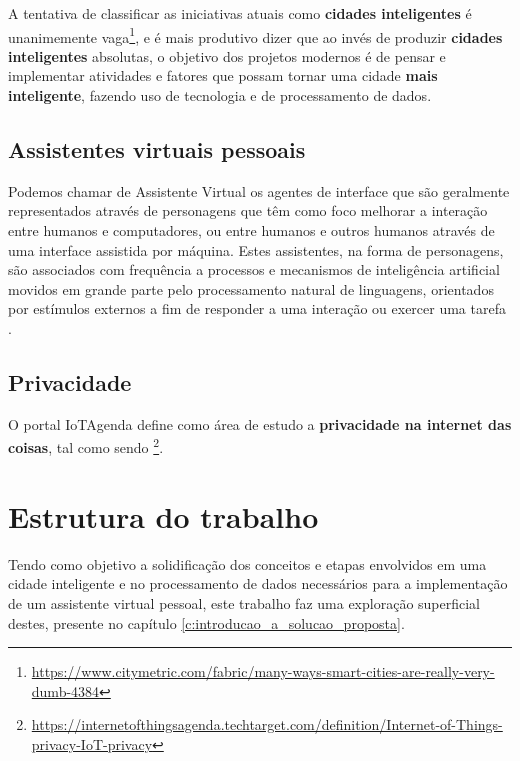 A tentativa de classificar as iniciativas atuais como \textbf{cidades inteligentes} é unanimemente vaga\footnote{\url{https://www.citymetric.com/fabric/many-ways-smart-cities-are-really-very-dumb-4384}}, e é mais produtivo dizer que ao invés de produzir \textbf{cidades inteligentes} absolutas, o objetivo dos projetos modernos é de pensar e implementar atividades e fatores que possam tornar uma cidade \textbf{mais inteligente}, fazendo uso de tecnologia e de processamento de dados.

\subsection{Assistentes virtuais pessoais} \label{ss:assistentes_virtuais_pessoais}

Podemos chamar de Assistente Virtual os agentes de interface que são geralmente representados através de personagens que têm como foco melhorar a interação entre humanos e computadores, ou entre humanos e outros humanos através de uma interface assistida por máquina. Estes assistentes, na forma de personagens, são associados com frequência a processos e mecanismos de inteligência artificial movidos em grande parte pelo processamento natural de linguagens, orientados por estímulos externos a fim de responder a uma interação ou exercer uma tarefa \cite{reategui2006agentes}.

\subsection{Privacidade} \label{ss:privacidade_na_internet_das_coisas}

O portal IoTAgenda define como área de estudo a \textbf{privacidade na internet das coisas}, tal como sendo  \footnote{\url{https://internetofthingsagenda.techtarget.com/definition/Internet-of-Things-privacy-IoT-privacy}}.

\section{Estrutura do trabalho} \label{s:estrutura_do_trabalho}

Tendo como objetivo a solidificação dos conceitos e etapas envolvidos em uma cidade inteligente e no processamento de dados necessários para a implementação de um assistente virtual pessoal, este trabalho faz uma exploração superficial destes, presente no capítulo \ref{c:introducao_a_solucao_proposta}.

